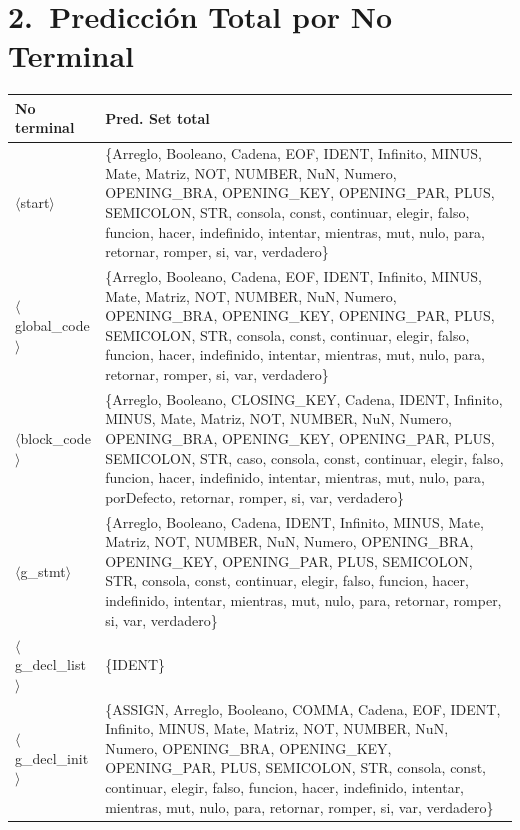 \documentclass[10pt]{article}
\begin{document}
\section*{2.\ Predicción Total por No Terminal}
{\footnotesize
\begin{longtable}{@{} p{3.5cm} p{13cm} @{}}
  \toprule
  \textbf{No terminal} & \textbf{Pred. Set total} \\
  \midrule \endhead
  \parbox[t]{3.3cm}{\raggedright$\langle$start$\rangle$} & \{Arreglo, Booleano, Cadena, EOF, IDENT, Infinito, MINUS, Mate, Matriz, NOT, NUMBER, NuN, Numero, OPENING\_BRA, OPENING\_KEY, OPENING\_PAR, PLUS, SEMICOLON, STR, consola, const, continuar, elegir, falso, funcion, hacer, indefinido, intentar, mientras, mut, nulo, para, retornar, romper, si, var, verdadero\} \\
  \parbox[t]{3.3cm}{\raggedright$\langle$global\_\allowbreak{}code$\rangle$} & \{Arreglo, Booleano, Cadena, EOF, IDENT, Infinito, MINUS, Mate, Matriz, NOT, NUMBER, NuN, Numero, OPENING\_BRA, OPENING\_KEY, OPENING\_PAR, PLUS, SEMICOLON, STR, consola, const, continuar, elegir, falso, funcion, hacer, indefinido, intentar, mientras, mut, nulo, para, retornar, romper, si, var, verdadero\} \\
  \parbox[t]{3.3cm}{\raggedright$\langle$block\_\allowbreak{}code$\rangle$} & \{Arreglo, Booleano, CLOSING\_KEY, Cadena, IDENT, Infinito, MINUS, Mate, Matriz, NOT, NUMBER, NuN, Numero, OPENING\_BRA, OPENING\_KEY, OPENING\_PAR, PLUS, SEMICOLON, STR, caso, consola, const, continuar, elegir, falso, funcion, hacer, indefinido, intentar, mientras, mut, nulo, para, porDefecto, retornar, romper, si, var, verdadero\} \\
  \parbox[t]{3.3cm}{\raggedright$\langle$g\_\allowbreak{}stmt$\rangle$} & \{Arreglo, Booleano, Cadena, IDENT, Infinito, MINUS, Mate, Matriz, NOT, NUMBER, NuN, Numero, OPENING\_BRA, OPENING\_KEY, OPENING\_PAR, PLUS, SEMICOLON, STR, consola, const, continuar, elegir, falso, funcion, hacer, indefinido, intentar, mientras, mut, nulo, para, retornar, romper, si, var, verdadero\} \\
  \parbox[t]{3.3cm}{\raggedright$\langle$g\_\allowbreak{}decl\_\allowbreak{}list$\rangle$} & \{IDENT\} \\
  \parbox[t]{3.3cm}{\raggedright$\langle$g\_\allowbreak{}decl\_\allowbreak{}init$\rangle$} & \{ASSIGN, Arreglo, Booleano, COMMA, Cadena, EOF, IDENT, Infinito, MINUS, Mate, Matriz, NOT, NUMBER, NuN, Numero, OPENING\_BRA, OPENING\_KEY, OPENING\_PAR, PLUS, SEMICOLON, STR, consola, const, continuar, elegir, falso, funcion, hacer, indefinido, intentar, mientras, mut, nulo, para, retornar, romper, si, var, verdadero\} \\

\end{longtable}}
\end{document}

